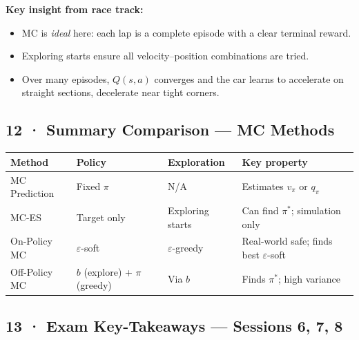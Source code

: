 \documentclass[11pt,a4paper]{article}
\begin{document}
\textbf{Key insight from race track:}
\begin{itemize}
  \item MC is \emph{ideal} here: each lap is a complete episode with a clear terminal reward.
  \item Exploring starts ensure all velocity–position combinations are tried.
  \item Over many episodes, $Q(s,a)$ converges and the car learns to accelerate on straight sections,
    decelerate near tight corners.
\end{itemize}

\subsection*{12 · Summary Comparison — MC Methods}

\begin{center}\small
\begin{tabular}{p{3.2cm}p{2.5cm}p{3.5cm}p{4.5cm}}
\toprule
\textbf{Method} & \textbf{Policy} & \textbf{Exploration} & \textbf{Key property} \\
\midrule
MC Prediction & Fixed $\pi$ & N/A & Estimates $v_\pi$ or $q_\pi$ \\
MC-ES & Target only & Exploring starts & Can find $\pi^*$; simulation only \\
On-Policy MC & $\varepsilon$-soft & $\varepsilon$-greedy & Real-world safe; finds best $\varepsilon$-soft \\
Off-Policy MC & $b$ (explore) + $\pi$ (greedy) & Via $b$ & Finds $\pi^*$; high variance \\
\bottomrule
\end{tabular}
\end{center}

\subsection*{13 · Exam Key-Takeaways — Sessions 6, 7, 8}
\end{document}
